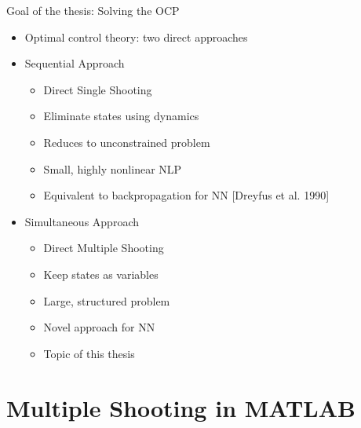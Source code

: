 \documentclass[11pt,t]{beamer}
\begin{document}

\begin{frame}[fragile]{Goal of the thesis: Solving the OCP}
\begin{itemize}
	\item Optimal control theory: two direct approaches
	\item Sequential Approach
	\begin{itemize}
		\item Direct Single Shooting
		\item Eliminate states using dynamics
		\item Reduces to unconstrained problem
		\item Small, highly nonlinear NLP
		\item Equivalent to backpropagation for NN [Dreyfus et al. 1990]
	\end{itemize}
	\item Simultaneous Approach
	\begin{itemize}
		\item Direct Multiple Shooting
		\item Keep states as variables
		\item Large, structured problem
		\item Novel approach for NN
		\item Topic of this thesis
	\end{itemize}
\end{itemize}
\end{frame}

\section{Multiple Shooting in MATLAB}
\end{document}
